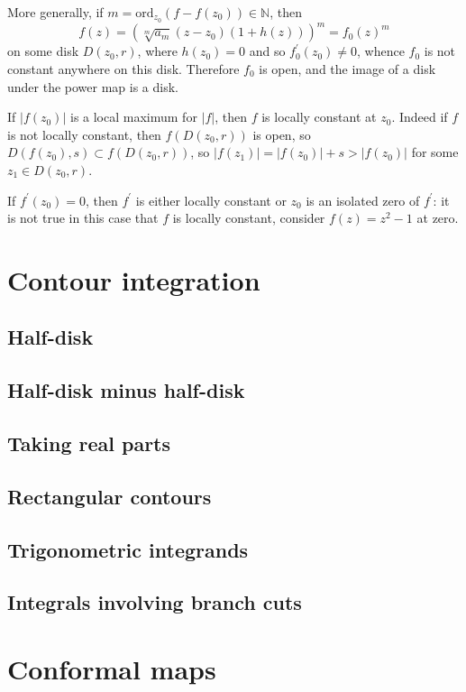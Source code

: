 \documentclass{article}
\newcommand{\ord}{\mathrm{ord}}
\begin{document}
More generally, if $m = \ord_{z_0} (f - f(z_0)) \in \mathbb{N}$, then
$$
f(z) = (\sqrt[m]{a_m} (z - z_0)(1 + h(z)))^m = f_0(z)^m
$$
on some disk $D(z_0, r)$, where $h(z_0) = 0$ and so $f_0^\prime(z_0)
\neq 0$, whence $f_0$ is not constant anywhere on this disk. Therefore
$f_0$ is open, and the image of a disk under the power map is a disk.

If $|f(z_0)|$ is a local maximum for $|f|$, then $f$ is locally
constant at $z_0$. Indeed if $f$ is not locally constant, then
$f(D(z_0, r))$ is open, so $D(f(z_0), s) \subset f(D(z_0, r))$, so
$|f(z_1)| = |f(z_0)| + s > |f(z_0)|$ for some $z_1 \in D(z_0, r)$.

If $f^\prime(z_0) = 0$, then $f^\prime$ is either locally constant or
$z_0$ is an isolated zero of $f^\prime$: it is not true in this case
that $f$ is locally constant, consider $f(z) = z^2 - 1$ at zero.


\section{Contour integration}

\subsection{Half-disk}

\subsection{Half-disk minus half-disk}

\subsection{Taking real parts}

\subsection{Rectangular contours}

\subsection{Trigonometric integrands}

\subsection{Integrals involving branch cuts}


\section{Conformal maps}
\end{document}
